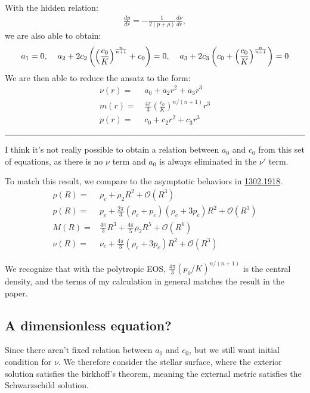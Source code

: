 \documentclass[10pt,oneside,headheight=10mm]{article}
\newcommand{\cb}[1]{\left(#1\right)}
\numberwithin{equation}{section}
\begin{document}
With the hidden relation:
\begin{align}
    \frac{dp}{dr} = -\frac{1}{2\cb{p+\rho}}\frac{d\nu}{dr},
\end{align}
we are also able to obtain:
\begin{align}
    a_1 = 0, \hspace{0.4cm}a_2 + 2c_2 \cb{ \left( \frac{c_0}{K} \right)^{\frac{n}{n+1}} + c_0 } = 0, \hspace{0.4cm} a_3 + 2c_3 \left( c_0 + \left( \frac{c_0}{K} \right)^{\frac{n}{n+1}} \right) = 0
\end{align}
We are then able to reduce the ansatz to the form:
\begin{align}
    \nu(r) =&\, a_0 + a_2r^2 + a_3r^3\\
    m(r) =&\,  \frac{4\pi}{3}\cb{\frac{c_0}{K}}^{n/(n+1)}r^3\\
    p(r) =&\, c_0 + c_2r^2 + c_3r^3
\end{align}
\rule{\linewidth}{0.8pt}
I think it's not really possible to obtain a relation between $a_0$ and $c_0$ from this set of equations, as there is no $\nu$ term and $a_0$ is always eliminated in the $\nu'$ term.


To match this result,  we compare to the asymptotic behaviors in \href{https://arxiv.org/pdf/1302.1918}{\color{Chocolate1} 1302.1918}.
\begin{align}
    \rho(R) =& \rho_c + \rho_2 R^2 + \mathcal{O}(R^3)\\
    p(R) =& p_c + \frac{2\pi}{3}(\rho_c + p_c)(\rho_c + 3p_c)R^2 + \mathcal{O}\cb{R^3}\\
    M(R) =& \frac{4\pi}{3}R^3 + \frac{4\pi}{5}\rho_2 R^5 + \mathcal{O}\cb{R^6}\\
    \nu(R) =& \nu_c + \frac{4\pi}{3}\cb{\rho_c + 3p_c}R^2 + \mathcal{O}(R^3)
\end{align}

We recognize that with the polytropic EOS, $\frac{4\pi}{3}\cb{p_0/K}^{n/(n+1)}$ is the central density, and the terms of my calculation in general matches the result in the paper. 






\subsection{A dimensionless equation?}
Since there aren't fixed relation between $a_0$ and $c_0$, but we still want initial condition for $\nu$. We therefore consider the stellar surface, where the exterior solution satisfies the birkhoff's theorem, meaning the external metric satisfies the Schwarzschild solution.
\end{document}
